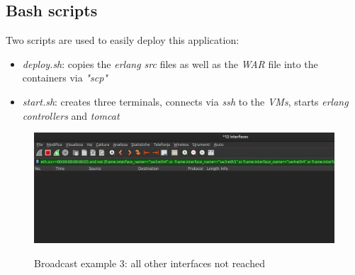 \documentclass{article}
\begin{document}
\subsection{Bash scripts}
Two scripts are used to easily deploy this application:
\begin{itemize}
    \item \textit{deploy.sh}: copies the \textit{erlang src} files as well as the \textit{WAR} file into the containers via \textit{"scp"}
    \item \textit{start.sh}: creates three terminals, connects via \textit{ssh} to the \textit{VMs}, starts \textit{erlang controllers} and \textit{tomcat}
\end{itemize}

\begin{figure}[H]
    \includegraphics[width=12cm, center]{images/3-unreached.png}
    \label{fig:3unreac}
    \caption{Broadcast example 3: all other interfaces not reached}
\end{figure}
\end{document}
